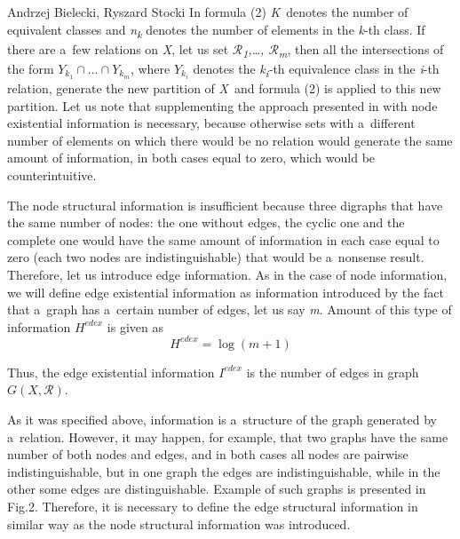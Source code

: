 \begin{artengenv2auth}{Andrzej Bielecki, Ryszard Stocki}
In formula (2) \textit{K}~denotes the number of equivalent classes and \textit{n}\textit{\textsubscript{k}} denotes the number of elements in the \textit{k}{}-th class. If there are a~few relations on \textit{X}, let us set $\mathcal{R}$\textit{\textsubscript{1}}\textit{,…, $\mathcal{R}$}\textit{\textsubscript{m}}, then all the intersections of the form $Y_{k_1}{\cap}{\dots}{\cap}Y_{k_m}$, where $Y_{k_i}$ denotes the \textit{k}\textit{\textsubscript{i}}\textit{{}-}th equivalence class in the \textit{i}{}-th relation, generate the new partition of \textit{X}~and formula (2) is applied to this new partition. Let us note that supplementing the approach presented in 
\parencite[][]{bielecki_information_2022} %
 with node existential information is necessary, because otherwise sets with a~different number of elements on which there would be no relation would generate the same amount of information, in both cases equal to zero, which would be counterintuitive.



The node structural information is insufficient because three digraphs that have the same number of nodes: the one without edges, the cyclic one and the complete one would have the same amount of information in each case equal to zero (each two nodes are indistinguishable) that would be a~nonsense result. Therefore, let us introduce edge information. As in the case of node information, we will define edge existential information as information introduced by the fact that a~graph has a~certain number of edges, let us say \textit{m}. Amount of this type of information $H^{\textit{edex}}$ is given as
\begingroup
\reqnos
\begin{equation}
H^{\textit{edex}}=\log (m+1)
\end{equation}
\endgroup

Thus, the edge existential information $I^{\textit{edex}}$ is the number of edges in graph $G(X,\mathcal{R})$.

As it was specified above, information is a~structure of the graph generated by a~relation. However, it may happen, for example, that two graphs have the same number of both nodes and edges, and in both cases all nodes are pairwise indistinguishable, but in one graph the edges are indistinguishable, while in the other some edges are distinguishable. Example of such graphs is presented in Fig.2. Therefore, it is necessary to define the edge structural information in similar way as the node structural information was introduced.



\end{artengenv2auth}

